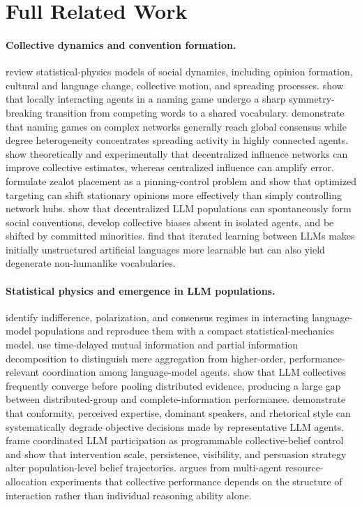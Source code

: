 \section{Full Related Work}
\label{app:full-related-work}

\paragraph{Collective dynamics and convention formation.}
\citet{castellano2009statistical} review statistical-physics models of social dynamics, including opinion formation, cultural and language change, collective motion, and spreading processes.
\citet{baronchelli2006sharp} show that locally interacting agents in a naming game undergo a sharp symmetry-breaking transition from competing words to a shared vocabulary.
\citet{dallasta2006nonequilibrium} demonstrate that naming games on complex networks generally reach global consensus while degree heterogeneity concentrates spreading activity in highly connected agents.
\citet{becker2017network} show theoretically and experimentally that decentralized influence networks can improve collective estimates, whereas centralized influence can amplify error.
\citet{masuda2015opinion} formulate zealot placement as a pinning-control problem and show that optimized targeting can shift stationary opinions more effectively than simply controlling network hubs.
\citet{ashery2025emergent} show that decentralized LLM populations can spontaneously form social conventions, develop collective biases absent in isolated agents, and be shifted by committed minorities.
\citet{kouwenhoven2025searching} find that iterated learning between LLMs makes initially unstructured artificial languages more learnable but can also yield degenerate non-humanlike vocabularies.

\paragraph{Statistical physics and emergence in LLM populations.}
\citet{el2026physics} identify indifference, polarization, and consensus regimes in interacting language-model populations and reproduce them with a compact statistical-mechanics model.
\citet{riedl2026emergent} use time-delayed mutual information and partial information decomposition to distinguish mere aggregation from higher-order, performance-relevant coordination among language-model agents.
\citet{hiddenbench2026} show that LLM collectives frequently converge before pooling distributed evidence, producing a large gap between distributed-group and complete-information performance.
\citet{ko2026social} demonstrate that conformity, perceived expertise, dominant speakers, and rhetorical style can systematically degrade objective decisions made by representative LLM agents.
\citet{he2026belief} frame coordinated LLM participation as programmable collective-belief control and show that intervention scale, persistence, visibility, and persuasion strategy alter population-level belief trajectories.
\citet{chopra2026interaction} argues from multi-agent resource-allocation experiments that collective performance depends on the structure of interaction rather than individual reasoning ability alone.

